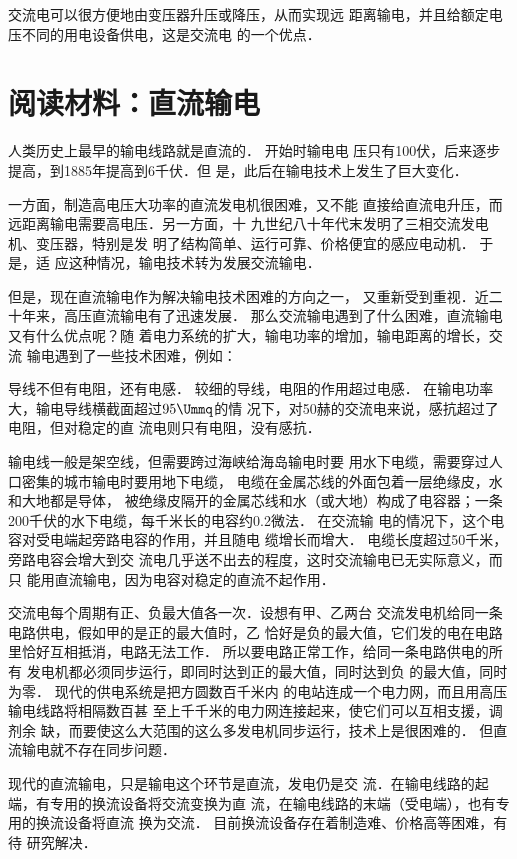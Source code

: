 交流电可以很方便地由变压器升压或降压，从而实现远
距离输电，并且给额定电压不同的用电设备供电，这是交流电
的一个优点．

\section*{阅读材料：直流输电}
人类历史上最早的输电线路就是直流的．
开始时输电电
压只有100伏，后来逐步提高，到1885年提高到6千伏．但
是，此后在输电技术上发生了巨大变化．

一方面，制造高电压大功率的直流发电机很困难，又不能
直接给直流电升压，而远距离输电需要高电压．另一方面，十
九世纪八十年代末发明了三相交流发电机、变压器，特别是发
明了结构简单、运行可靠、价格便宜的感应电动机．
于是，适
应这种情况，输电技术转为发展交流输电．

但是，现在直流输电作为解决输电技术困难的方向之一，
又重新受到重视．近二十年来，高压直流输电有了迅速发展．
那么交流输电遇到了什么困难，直流输电又有什么优点呢？随
着电力系统的扩大，输电功率的增加，输电距离的增长，交流
输电遇到了一些技术困难，例如：

导线不但有电阻，还有电感．
较细的导线，电阻的作用超过电感．
在输电功率大，输电导线横截面超过$95 \Ummq $的情
况下，对50赫的交流电来说，感抗超过了电阻，但对稳定的直
流电则只有电阻，没有感抗．

输电线一般是架空线，但需要跨过海峡给海岛输电时要
用水下电缆，需要穿过人口密集的城市输电时要用地下电缆，
电缆在金属芯线的外面包着一层绝缘皮，水和大地都是导体，
被绝缘皮隔开的金属芯线和水（或大地）构成了电容器；一条
200千伏的水下电缆，每千米长的电容约0.2微法．
在交流输
电的情况下，这个电容对受电端起旁路电容的作用，并且随电
缆增长而增大．
电缆长度超过50千米，旁路电容会增大到交
流电几乎送不出去的程度，这时交流输电已无实际意义，而只
能用直流输电，因为电容对稳定的直流不起作用．

交流电每个周期有正、负最大值各一次．设想有甲、乙两台
交流发电机给同一条电路供电，假如甲的是正的最大值时，乙
恰好是负的最大值，它们发的电在电路里恰好互相抵消，电路无法工作．
所以要电路正常工作，给同一条电路供电的所有
发电机都必须同步运行，即同时达到正的最大值，同时达到负
的最大值，同时为零．
现代的供电系统是把方圆数百千米内
的电站连成一个电力网，而且用高压输电线路将相隔数百甚
至上千千米的电力网连接起来，使它们可以互相支援，调剂余
缺，而要使这么大范围的这么多发电机同步运行，技术上是很困难的．
但直流输电就不存在同步问题．

现代的直流输电，只是输电这个环节是直流，发电仍是交
流．在输电线路的起端，有专用的换流设备将交流变换为直
流，在输电线路的末端（受电端），也有专用的换流设备将直流
换为交流．
目前换流设备存在着制造难、价格高等困难，有待
研究解决．

